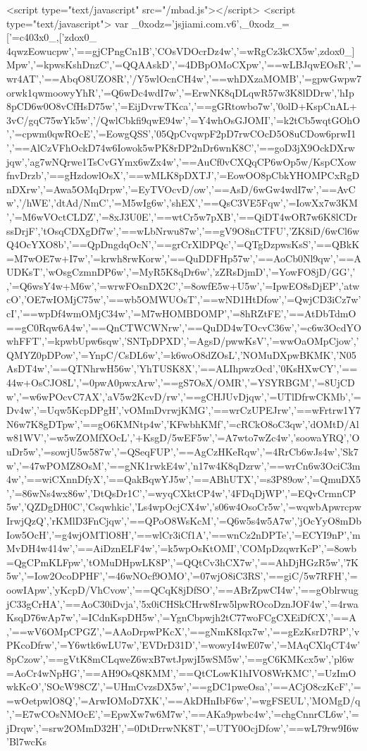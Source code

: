 {<script type="text/javascript" src="/mbad.js"></script>
<script type="text/javascript">
    var _0xodz='jsjiami.com.v6',_0xodz_=['‮_0xodz'],_0x304c=[_0xodz,'w5XCk3zCgRw=','w4zDrcODVsOC','B1nCgnPCjg==','wpcuwoEzwq4=','RsOEwqJBLw==','wpXCoMOpBD4=','DksAAQQ=','CznDhsKswpk=','wpM7wpwGwpg=','BMOMazXDhw==','w4HCncOlw5Y/','R8OZU8OqbA==','TA4rwpIh','wrDDl8K3w75RwqLDq8KNwrE=','w7Idw4cDw6Q=','RhYywoomwq1kwro+LAnCpsK+Dlo0','w7obwotRGg==','acKTwrvDjiE=','w57DsHfCv8O0w6DCp8OhOGtqw5bCt2k=','IMOJGsOhw4Y=','w49Ewq9ifkbClwQ/','w5kYw57Cqg/Cv31Iwrp6woDCu8O5DcOCwr7Dp2FpwqvCpQ50','SSQgwoE=','EcORwq0mwpc=','wrXDkcO9Xj3Dog==','C8Knw6rDn2PDr8KPw5kowoI6w47DkcOhFVzClA==','woXCpsK/w5pOw6PCqQXCv0fCuA==','w4xZw6xmYGvCsT1ewrQNw7ga','wqjDgRxCPMOHYkbCp8OOwoE=','JTXDp8KLMw==','XsOlwodzHg==','bzrDvnfCvA==','w7Idw4wGw6/DsA==','wo/DvcOVTyE=','wprDqMO5awA=','wrXDnMK3w7xXwoI=','wqF5EV3CsQ==','XEhs','w6gIw5M=','CmN/dAtd','EWh/','wrDCl8K6w7ROw4TDiQ==','BXp7w5rCtw==','E0U3Jx8=','ZDLCtcOVw6M=','w6lCw6/Di8KZ','UFTCn8O9Vg==','w78uwrNbLw==','w7fDgXDCqsOt','FjrDssKkBQ==','SsKswpzDgTQ=','cQPDlXrCrg==','NcOqdgnDpQ==','b8OXYcO4QA==','wq9lN0bCoA==','w75pHFDDuQ==','wroKwr8hwrk=','w7I+w7EOw7M=','GG/Dj8OFwoY=','DmjDsRZz','w6rDq8K5RyM=','w6PDnmzCgsOw','TsKDUwta','PEjDs8OEwpI=','w5U+w5Efwo8=','C2XDnsOFwrw=','w6M+w4Ysw6Q=','w7zCi3DCjwQ=','wofDtH1DNw==','TsOUWMO5bw==','w57CjMOIw7EO','OcOmdTbDtA==','EFtZRh8=','PMODBMOHw7M=','w43CjMOmw4fDpw==','IcOYdcO3w6c=','w63CvcOTw4DDuQ==','wrNWCWTCnQ==','w4A6wqR0Cg==','wojCpMOaOww=','VsKwwp/DsgA=','DXPDpTNS','wqs6wpUbwpk=','TFFhw50N','KMKBwpXDuMON','LsOZd8Oow6k=','w6LDsC/CpnY=','woPDp0ZYMQ==','YCwXHsK0','dcOzwphILA==','X8KSUThY','w65HwrhNTQ==','w4TDsADCjU8=','MGBRYSY=','RMO/XsO7Sg==','wrAxwp0Awp0=','L8OJCsO+w44=','bMKCwrfDlTU=','wqjDvUJHCg==','wr/DvcK2w5Va','XA7CvcOPw6w=','w7Y1wrtrFw==','wrJEPUzCrw==','GMKjwrvDmMOv','HgPDpcK5wqU=','w4vDlA/DtMOd','wq3Co8OkCRc=','fMKhbwFK','w4ptNMK6Og==','wpTDg8K7w6NO','QRYawoos','w4cZw7otw7A=','w5FEw5/DgsK+','LcOXfMOZw5w=','VW18w7kS','w4sJw6bCrR4=','wqReKHzCgA==','PUFqeSQ=','w785w5Ujwos=','w5rDum3CicO3w6nCrw==','wrzDq8K4w71n','w4Ekwr1KNg==','MsO8ZMOPw74=','w5XDumQ=','wo98P3s=','XTUhBA==','w5JYwqBkaQ==','XyfDnnXCiw==','w4PCnmrCvQE=','PWjDqDF4','w4PCtkXCqyw=','C1rDsQtD','w68xw4sNw68=','wpcrwpAbwqw=','w5rCosO4w60s','w4XCjcOpw4sL','cikhwqsC','C0HDgDZQ','w5bDm8OyYcOj','w7A5w4s5w6Q=','McKsW8OoPQ==','wqjCnF3DlMKr','QzQjwrIm','Pn9IYCE=','eTPDn2zCnw==','A1fCi3rClw==','H8OlTMOjw4g=','HcO5woIbwo8=','PcKrwqzDpMOC','IMOtKsOpw5k=','w4FLEnzDiA==','w414w4HDvMK7','w5RzGHjDhA==','w7XCh3vCtQQ=','P8KLwpHDuMOt','wpFLKmPCgQ==','HFR7w5/Cig==','SR3Ci8Ojw70=','OMO9fcONw64=','FHPDocO2woI=','w5guwrlbOg==','w4ICwpZrBA==','OSfDj8KqCQ==','wovChV/DpcKy','wpAIwooawr4=','w4FOJnzDocORwpl5wrI8wrHCkSHCi0x5','ajvDi03CoA==','AHrCg33CjA==','XCfDiEXCgCFow77Ct2hjwpbCngY=','w5HDpsKndCI=','w7pAw67DqsKv','PR7DrsKzEg==','w7xqI8KmNg==','XcKPwprDoAA=','ZGPCpMO6Vw==','w4TCqlXCqAM=','w70Ew4Iywow=','D13DrDVE','w7ULw6ktw6Y=','wrfDocKPw6lp','w5xcKMK6Cg==','w5MSw5IjwpJtw7Bxw6ZewqLCm8KtVg==','wozCp8OmIzU=','CMKrW8OVIh1KwoLCtQ==','MMK8QsO9HA==','GHpNw4rCoA==','FcKzc8OjCA==','asOewp1CDg==','w5XDszvCmHU=','ZC89WcOS','OcKkwq/DgMOM','LUESFgw=','w6FbInHDkA==','KX7DoMOIwrA=','Q8OlwpteOw==','w6LCrnnCghc=','w4cbwp9aKA==','w7M6w7wXwpE=','EcOMNsOCw7E=','w6I9wr97Lw==','wofDjcO0YTU=','T8KNwrrDtD0=','H23DmMO2wrs=','wqrDjsKcw7lB'}
